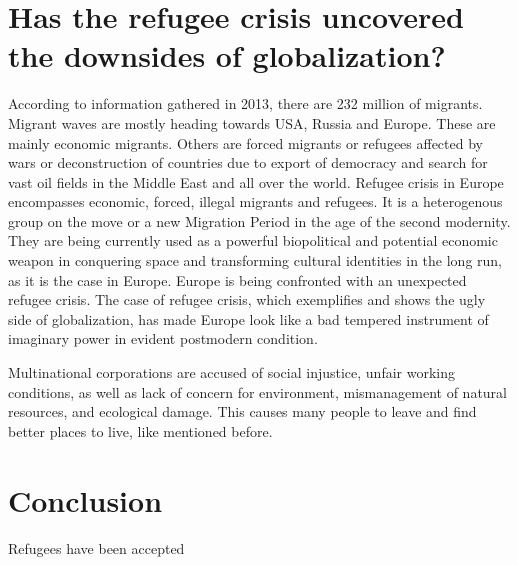\section{Has the refugee crisis uncovered the downsides of \mbox{globalization}?}

According to information gathered in 2013, there are 232 million of migrants. Migrant waves are mostly heading towards USA, Russia and Europe. These are mainly economic migrants. Others are forced migrants or refugees affected by wars or deconstruction of countries due to export of democracy and search for vast oil fields in the Middle East and all over the world. Refugee crisis in Europe encompasses economic, forced, illegal migrants and refugees. It is a heterogenous group on the move or a new Migration Period in the age of the second modernity. They are being currently used as a powerful biopolitical and potential economic weapon in conquering space and transforming cultural identities in the long run, as it is the case in Europe. Europe is being confronted with an unexpected refugee crisis. The case of refugee crisis, which exemplifies and shows the ugly side of globalization, has made Europe look like a bad tempered instrument of imaginary power in evident postmodern condition.

Multinational corporations are accused of social injustice, unfair working conditions, as well as lack of concern for environment, mismanagement of natural resources, and ecological damage. This causes many people to leave and find better places to live, like mentioned before.

\section{Conclusion}
Refugees have been accepted

